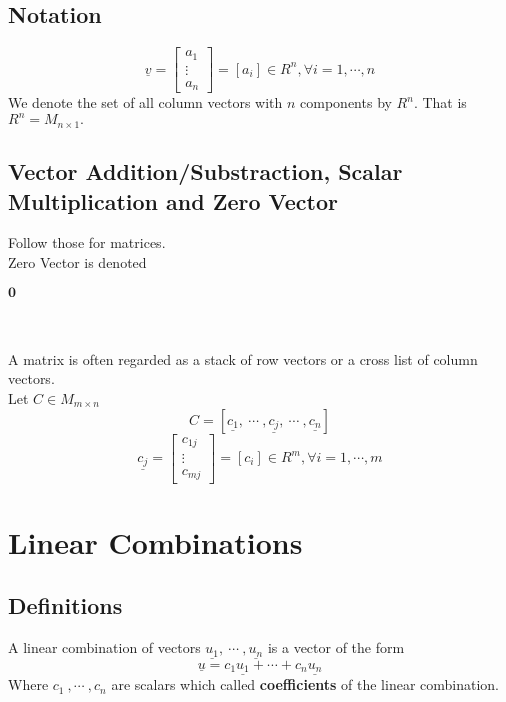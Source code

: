 \documentclass[12pt]{article}
\begin{document}
\subsection{Notation}
\begin{equation}
	\underline{v}=
	\left[
	\begin{array}{c}
	a_1 \\
	\vdots \\
	a_n
	\end{array}
	\right]
	= [a_i] \in R^n , \forall i = 1,\cdots,n
\end{equation}
We denote the set of all column vectors with $n$ components by $R^n$. That is $R^n = M_{n \times 1}.$

\subsection{Vector Addition/Substraction, Scalar Multiplication and Zero Vector}
Follow those for matrices.\\

Zero Vector is denoted \begin{large}$\textbf{0}$\end{large}\\\\
A matrix is often regarded as a stack of row vectors or a cross list of column vectors.\\
Let $C \in M_{m \times n}$\\
$$C = [\underline{c_1},\ \cdots\ ,\underline{c_j},\ \cdots\ ,\underline{c_n}]$$
\begin{equation}
	\underline{c_j}=
	\left[
	\begin{array}{c}
	c_{1j} \\
	\vdots \\
	c_{mj}
	\end{array}
	\right]
	= [c_i] \in R^m , \forall i = 1,\cdots,m
\end{equation}

\section{Linear Combinations}
\subsection{Definitions}
A linear combination of vectors $\underline{u_1},\ \cdots\ , \underline{u_n}$ is a vector of the form
$$\underline{u}=c_1\underline{u_1} + \cdots + c_n\underline{u_n}$$
Where $c_1\ ,\cdots\ ,c_n$ are scalars which called \textbf{coefficients} of the linear combination.
\end{document}
